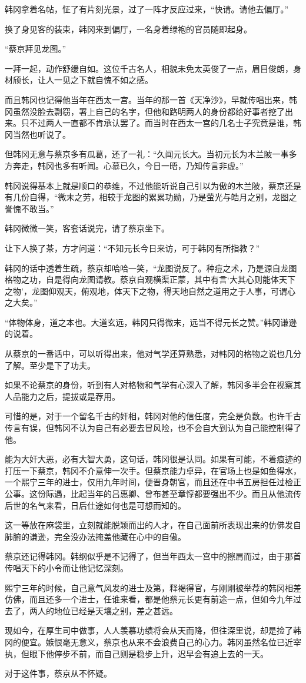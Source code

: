 韩冈拿着名帖，怔了有片刻光景，过了一阵才反应过来，“快请。请他去偏厅。”

换了身见客的装束，韩冈来到偏厅，一名身着绿袍的官员随即起身。

“蔡京拜见龙图。”

一拜一起，动作舒缓自如。这位千古名人，相貌未免太英俊了一点，眉目俊朗，身材颀长，让人一见之下就自愧不如之感。

而且韩冈也记得他当年在西太一宫。当年的那一首《天净沙》，早就传唱出来，韩冈虽然没脸去剽窃，署上自己的名字，但他和路明两人的身份都给好事者挖了出来。只不过两人一直都不肯承认罢了。而当时在西太一宫的几名士子究竟是谁，韩冈当然也听说了。

但韩冈无意与蔡京多有瓜葛，还了一礼：“久闻元长大。当初元长为木兰陂一事多方奔走，韩冈也多有听闻。心慕已久，今日一晤，乃知传言非虚。”

韩冈说得基本上就是顺口的恭维，不过他能听说自己引以为傲的木兰陂，蔡京还是有几份自得，“微末之劳，相较于龙图的累累功勋，乃是萤光与皓月之别，龙图之誉愧不敢当。”

韩冈微微一笑，客套话说完，请了蔡京坐下。

让下人换了茶，方才问道：“不知元长今日来访，可于韩冈有所指教？”

韩冈的话中透着生疏，蔡京却哈哈一笑，“龙图说反了。种痘之术，乃是源自龙图格物之功，自是得向龙图请教。蔡京自观横渠正蒙，其中有言‘大其心则能体天下之物’，龙图仰观天，俯观地，体天下之物，得天地自然之道用之于人事，可谓心之大矣。”

“体物体身，道之本也。大道玄远，韩冈只得微末，远当不得元长之赞。”韩冈谦逊的说着。

从蔡京的一番话中，可以听得出来，他对气学还算熟悉，对韩冈的格物之说也几分了解。至少是下了功夫。

如果不论蔡京的身份，听到有人对格物和气学有心深入了解，韩冈多半会在视察其人品能力之后，提拔或是荐用。

可惜的是，对于一个留名千古的奸相，韩冈对他的信任度，完全是负数。也许千古传言有误，但韩冈不认为自己有必要去冒风险，也不会自大到认为自己能控制得了他。

能为大奸大恶，必有大智大勇，这句话，韩冈很是认同。如果有可能，不着痕迹的打压一下蔡京，韩冈不介意伸一次手。但蔡京能力卓异，在官场上也是如鱼得水，一个熙宁三年的进士，仅用九年时间，便晋身朝官，而且还在中书五房担任过检正公事。这份际遇，比起当年的吕惠卿、曾布甚至章惇都要强出不少。而且从他流传后世的名气来看，日后仕途如何也是可想而知的。

这一等放在麻袋里，立刻就能脱颖而出的人才，在自己面前所表现出来的仿佛发自肺腑的谦逊，完全没办法掩盖他藏在心中的自傲。

蔡京还记得韩冈。韩纲似乎是不记得了，但当年西太一宫中的擦肩而过，由于那首传唱天下的小令而让他记忆深刻。

熙宁三年的时候，自己意气风发的进士及第，释褐得官，与刚刚被举荐的韩冈相差仿佛，而且还多一个进士，任谁来看，都是他蔡元长更有前途一点，但如今九年过去了，两人的地位已经是天壤之别，差之甚远。

现如今，在厚生司中做事，人人羡慕功绩将会从天而降，但往深里说，却是捡了韩冈的便宜。嫉恨毫无意义，蔡京也从来不会浪费自己的心力。韩冈虽然名位已近宰执，但眼下他停步不前，而自己则是稳步上升，迟早会有追上去的一天。

对于这件事，蔡京从不怀疑。

